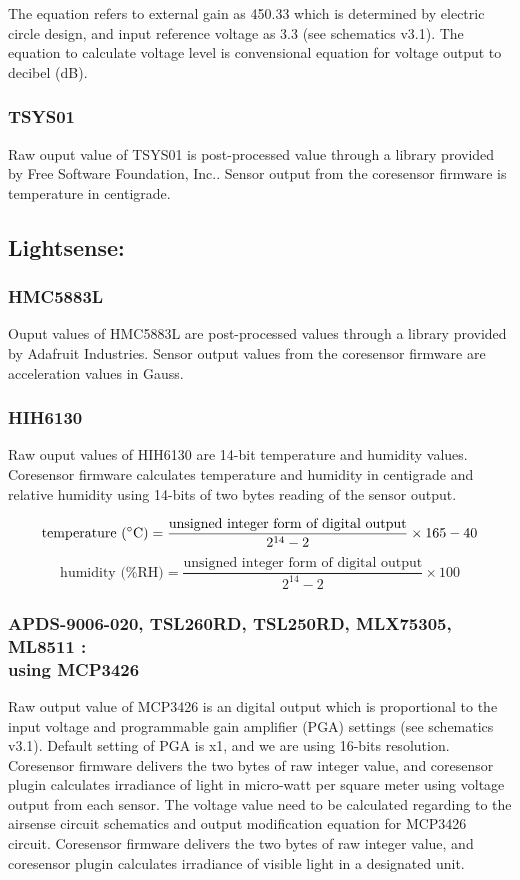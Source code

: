  \bigbreak
 The equation refers to external gain as 450.33 which is determined by electric circle design, and input reference voltage as 3.3 (see schematics v3.1). The equation to calculate voltage level is convensional equation for voltage output to decibel (dB).
 
\subsubsection{ TSYS01}

Raw ouput value of TSYS01 is post-processed value through a library provided by  Free Software Foundation, Inc.. Sensor output from the coresensor firmware is temperature in centigrade.


\subsection{Lightsense:}
\subsubsection{ HMC5883L}

Ouput values of HMC5883L are post-processed values through a library provided by Adafruit Industries. Sensor output values from the coresensor firmware are acceleration values in Gauss.

\subsubsection{ HIH6130}

Raw ouput values of HIH6130 are 14-bit temperature and humidity values. Coresensor firmware calculates temperature and humidity in centigrade and relative humidity using 14-bits of two bytes reading of the sensor output.

{\centering
 \[ \text{temperature (\degree C)} = \frac{\text{unsigned integer form of digital output}}{2^{14} - 2} \times 165 - 40 \] 
 \[ \text{humidity (\%RH)} = \frac{\text{unsigned integer form of digital output}}{2^{14} - 2} \times 100 \]
 \par
 }


\subsubsection[MCP3426]{ APDS-9006-020, TSL260RD, TSL250RD, MLX75305, ML8511 : \\ using MCP3426}

Raw output value of MCP3426 is an digital output which is proportional to the input voltage and programmable gain amplifier (PGA) settings (see schematics v3.1). Default setting of PGA is x1, and we are using 16-bits resolution. Coresensor firmware delivers the two bytes of raw integer value, and coresensor plugin calculates irradiance of light in micro-watt per square meter using voltage output from each sensor. The voltage value need to be calculated regarding to the airsense circuit schematics and output modification equation for MCP3426 circuit. Coresensor firmware delivers the two bytes of raw integer value, and coresensor plugin calculates irradiance of visible light in a designated unit.

